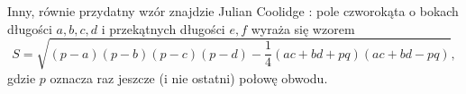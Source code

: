 Inny, równie przydatny wzór znajdzie Julian Coolidge \cite{coolidge_1939}:
%
pole czworokąta o bokach długości $a, b, c, d$ i przekątnych długości $e, f$ wyraża się wzorem
\begin{equation}
    S = \sqrt{(p-a)(p-b)(p-c)(p-d) - \frac 1 4 (ac + bd + pq)(ac + bd - pq)},
\end{equation}
gdzie $p$ oznacza raz jeszcze (i nie ostatni) połowę obwodu.

%


